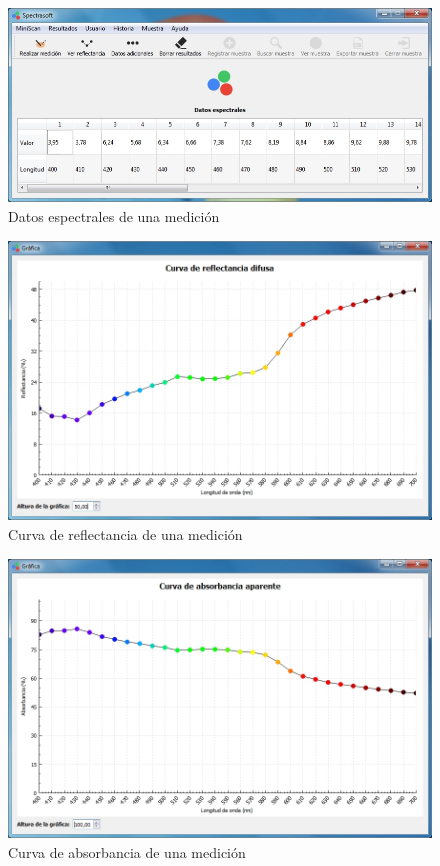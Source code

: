 \begin{figure}[H]
  \centering
  \includegraphics[width=1\linewidth]{./img/resultados.jpg}
\caption[]{Datos espectrales de una medici\'{o}n\label{fig:datos-espectrales}}
\end{figure}

\begin{figure}[H]
  \centering
  \includegraphics[width=1\linewidth]{./img/resultados-reflectancia.jpg}
\caption[]{Curva de reflectancia de una medici\'{o}n\label{fig:resultados-reflectancia}}
\end{figure}

\newpage

\begin{figure}[H]
  \centering
  \includegraphics[width=1\linewidth]{./img/resultados-absorbancia.jpg}
\caption[]{Curva de absorbancia de una medici\'{o}n\label{fig:resultados-absorbancia}}
\end{figure}

